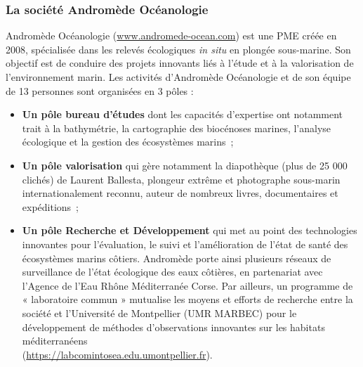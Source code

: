 \subsubsection{La société Andromède Océanologie}\label{intro.2.3.1}

Andromède Océanologie (\href{www.andromede-ocean.com}{www.andromede-ocean.com}) est une PME créée en 2008, spécialisée dans les relevés écologiques \textit{in situ} en plongée sous-marine. Son objectif est de conduire des projets innovants liés à l'étude et à la valorisation de l'environnement marin. Les activités d’Andromède Océanologie et de son équipe de 13 personnes sont organisées en 3 pôles : 

\begin{itemize}
    \item \textbf{Un pôle bureau d’études} dont les capacités d’expertise ont notamment trait à la bathymétrie, la cartographie des biocénoses marines, l’analyse écologique et la gestion des écosystèmes marins~;
    
    \item \textbf{Un pôle valorisation} qui gère notamment la diapothèque (plus de 25 000 clichés) de Laurent Ballesta, plongeur extrême et photographe sous-marin internationalement reconnu, auteur de nombreux livres, documentaires et expéditions~;
    
    \item \textbf{Un pôle Recherche et Développement} qui met au point des technologies innovantes pour l’évaluation, le suivi et l’amélioration de l’état de santé des écosystèmes marins côtiers. Andromède porte ainsi plusieurs réseaux de surveillance de l’état écologique des eaux côtières, en partenariat avec l’Agence de l’Eau Rhône Méditerranée Corse. Par ailleurs, un programme de « laboratoire commun » mutualise les moyens et efforts de recherche entre la société et l’Université de Montpellier (UMR MARBEC) pour le développement de méthodes d’observations innovantes sur les habitats méditerranéens\\ (\href{https://labcomintosea.edu.umontpellier.fr}{https://labcomintosea.edu.umontpellier.fr}).
\end{itemize}

